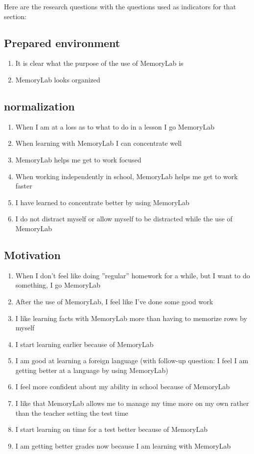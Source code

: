 \documentclass[12pt, a4paper]{article}
\begin{document}
Here are the research questions with the questions used as indicators for that section:

\subsection*{Prepared environment}
\begin{enumerate}
    \item It is clear what the purpose of the use of MemoryLab is
    \item MemoryLab looks organized
\end{enumerate}
\subsection*{normalization}
\begin{enumerate}
    \item When I am at a loss as to what to do in a lesson I go MemoryLab
    \item When learning with MemoryLab I can concentrate well
    \item MemoryLab helps me get to work focused
    \item When working independently in school, MemoryLab helps me get to work faster
    \item I have learned to concentrate better by using MemoryLab
    \item I do not distract myself or allow myself to be distracted while the use of MemoryLab
\end{enumerate}
\subsection*{Motivation}
\begin{enumerate}
    \item When I don't feel like doing ''regular'' homework for a while, but I want to do something, I go MemoryLab
    \item After the use of MemoryLab, I feel like I've done some good work
    \item I like learning facts with MemoryLab more than having to memorize rows by myself
    \item I start learning earlier because of MemoryLab
    \item I am good at learning a foreign language (with follow-up question: I feel I am getting better at a language by using MemoryLab)
    \item I feel more confident about my ability in school because of MemoryLab
    \item I like that MemoryLab allows me to manage my time more on my own rather than the teacher setting the test time
    \item I start learning on time for a test better because of MemoryLab
    \item I am getting better grades now because I am learning with MemoryLab
\end{enumerate}
\end{document}
